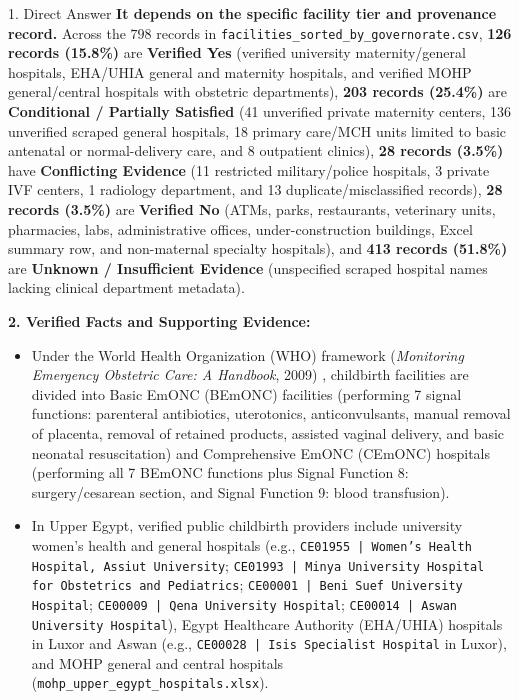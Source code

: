 \documentclass[10pt,a4paper]{article}
\begin{document}
\begin{auditbox}{1. Direct Answer}
\textbf{It depends on the specific facility tier and provenance record.} Across the $798$ records in \texttt{facilities\_sorted\_by\_governorate.csv}, \textbf{126 records (15.8\%)} are \textbf{Verified Yes} (verified university maternity/general hospitals, EHA/UHIA general and maternity hospitals, and verified MOHP general/central hospitals with obstetric departments), \textbf{203 records (25.4\%)} are \textbf{Conditional / Partially Satisfied} (41 unverified private maternity centers, 136 unverified scraped general hospitals, 18 primary care/MCH units limited to basic antenatal or normal-delivery care, and 8 outpatient clinics), \textbf{28 records (3.5\%)} have \textbf{Conflicting Evidence} (11 restricted military/police hospitals, 3 private IVF centers, 1 radiology department, and 13 duplicate/misclassified records), \textbf{28 records (3.5\%)} are \textbf{Verified No} (ATMs, parks, restaurants, veterinary units, pharmacies, labs, administrative offices, under-construction buildings, Excel summary row, and non-maternal specialty hospitals), and \textbf{413 records (51.8\%)} are \textbf{Unknown / Insufficient Evidence} (unspecified scraped hospital names lacking clinical department metadata).
\end{auditbox}

\textbf{2. Verified Facts and Supporting Evidence:}
\begin{itemize}
    \item Under the World Health Organization (WHO) framework (\textit{Monitoring Emergency Obstetric Care: A Handbook}, 2009) \cite{who2009emonc}, childbirth facilities are divided into Basic EmONC (BEmONC) facilities (performing 7 signal functions: parenteral antibiotics, uterotonics, anticonvulsants, manual removal of placenta, removal of retained products, assisted vaginal delivery, and basic neonatal resuscitation) and Comprehensive EmONC (CEmONC) hospitals (performing all 7 BEmONC functions plus Signal Function 8: surgery/cesarean section, and Signal Function 9: blood transfusion).
    \item In Upper Egypt, verified public childbirth providers include university women's health and general hospitals (e.g., \texttt{CE01955 | Women's Health Hospital, Assiut University}; \texttt{CE01993 | Minya University Hospital for Obstetrics and Pediatrics}; \texttt{CE00001 | Beni Suef University Hospital}; \texttt{CE00009 | Qena University Hospital}; \texttt{CE00014 | Aswan University Hospital}), Egypt Healthcare Authority (EHA/UHIA) hospitals in Luxor and Aswan (e.g., \texttt{CE00028 | Isis Specialist Hospital} in Luxor), and MOHP general and central hospitals (\texttt{mohp\_upper\_egypt\_hospitals.xlsx}).
\end{itemize}
\end{document}
